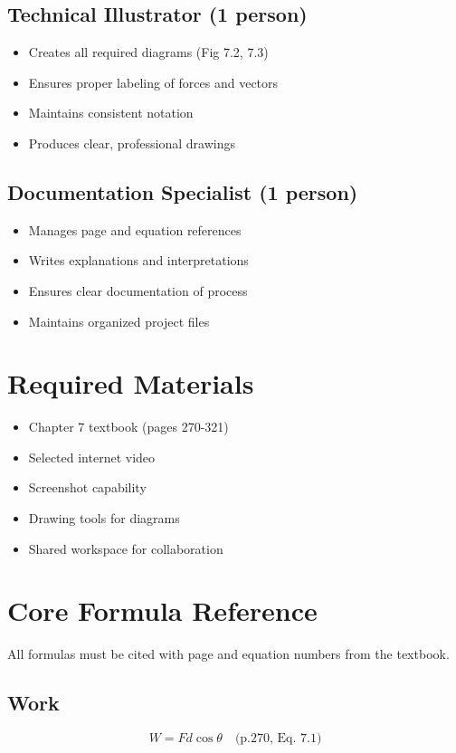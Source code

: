 \documentclass[12pt]{article}
\begin{document}
\subsection{Technical Illustrator (1 person)}
\begin{itemize}
\item Creates all required diagrams (Fig 7.2, 7.3)
\item Ensures proper labeling of forces and vectors
\item Maintains consistent notation
\item Produces clear, professional drawings
\end{itemize}

\subsection{Documentation Specialist (1 person)}
\begin{itemize}
\item Manages page and equation references
\item Writes explanations and interpretations
\item Ensures clear documentation of process
\item Maintains organized project files
\end{itemize}

\section{Required Materials}
\begin{itemize}
\item Chapter 7 textbook (pages 270-321)
\item Selected internet video
\item Screenshot capability
\item Drawing tools for diagrams
\item Shared workspace for collaboration
\end{itemize}

\section{Core Formula Reference}
All formulas must be cited with page and equation numbers from the textbook.

\subsection{Work}
\begin{equation}
W = Fd\cos\theta \quad \text{(p.270, Eq. 7.1)}
\end{equation}
\end{document}
